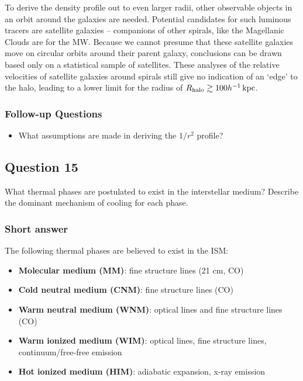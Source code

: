 \documentclass[a4paper,10pt]{article}
\begin{document}
{\noindent}To derive the density profile out to even larger radii, other observable objects in an orbit around the galaxies are needed. Potential candidates for such luminous tracers are satellite galaxies -- companions of other spirals, like the Magellanic Clouds are for the MW. Because we cannot presume that these satellite galaxies move on circular orbits around their parent galaxy, conclusions can be drawn based only on a statistical sample of satellites. These analyses of the relative velocities of satellite galaxies around spirals still give no indication of an `edge' to the halo, leading to a lower limit for the radius of $R_{\rm halo}\gtrsim100h^{-1}\,{\rm kpc}$.

\subsubsection{Follow-up Questions}

\begin{itemize}
    \item What assumptions are made in deriving the $1/r^2$ profile?
\end{itemize}


\newpage
\subsection{Question 15}

What thermal phases are postulated to exist in the interstellar medium? Describe the dominant mechanism of cooling for each phase.

\subsubsection{Short answer}

The following thermal phases are believed to exist in the ISM:

\begin{itemize}
    \item \textbf{Molecular medium (MM)}: fine structure lines (21 cm, CO)
    \item \textbf{Cold neutral medium (CNM)}: fine structure lines (CO)
    \item \textbf{Warm neutral medium (WNM)}: optical lines and fine structure lines (CO)
    \item \textbf{Warm ionized medium (WIM)}: optical lines, fine structure lines, continuum/free-free emission
    \item \textbf{Hot ionized medium (HIM)}: adiabatic expansion, x-ray emission
\end{itemize}
\end{document}
